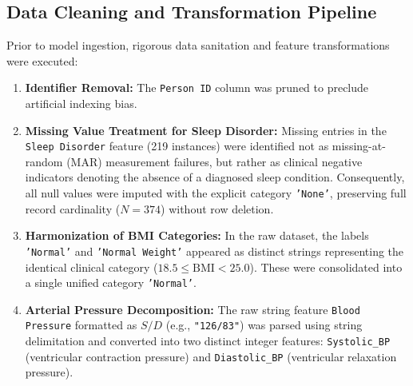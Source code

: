 \documentclass[12pt,a4paper]{article}
\begin{document}
\subsection{Data Cleaning and Transformation Pipeline}
Prior to model ingestion, rigorous data sanitation and feature transformations were executed:
\begin{enumerate}
    \item \textbf{Identifier Removal:} The \texttt{Person ID} column was pruned to preclude artificial indexing bias.
    \item \textbf{Missing Value Treatment for Sleep Disorder:} Missing entries in the \texttt{Sleep Disorder} feature (219 instances) were identified not as missing-at-random (MAR) measurement failures, but rather as clinical negative indicators denoting the absence of a diagnosed sleep condition. Consequently, all null values were imputed with the explicit category \texttt{'None'}, preserving full record cardinality ($N = 374$) without row deletion.
    \item \textbf{Harmonization of BMI Categories:} In the raw dataset, the labels \texttt{'Normal'} and \texttt{'Normal Weight'} appeared as distinct strings representing the identical clinical category ($18.5 \le \text{BMI} < 25.0$). These were consolidated into a single unified category \texttt{'Normal'}.
    \item \textbf{Arterial Pressure Decomposition:} The raw string feature \texttt{Blood Pressure} formatted as $S/D$ (e.g., \texttt{"126/83"}) was parsed using string delimitation and converted into two distinct integer features: \texttt{Systolic\_BP} (ventricular contraction pressure) and \texttt{Diastolic\_BP} (ventricular relaxation pressure).
\end{enumerate}
\end{document}
